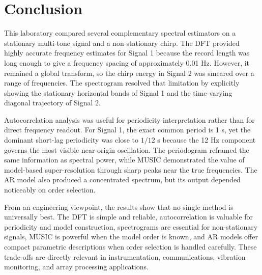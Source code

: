 \documentclass[12pt, a4paper]{article}
\begin{document}
\section{Conclusion}
This laboratory compared several complementary spectral estimators on a stationary multi-tone signal and a non-stationary chirp. The DFT provided highly accurate frequency estimates for Signal 1 because the record length was long enough to give a frequency spacing of approximately 0.01 Hz. However, it remained a global transform, so the chirp energy in Signal 2 was smeared over a range of frequencies. The spectrogram resolved that limitation by explicitly showing the stationary horizontal bands of Signal 1 and the time-varying diagonal trajectory of Signal 2.

Autocorrelation analysis was useful for periodicity interpretation rather than for direct frequency readout. For Signal 1, the exact common period is 1 s, yet the dominant short-lag periodicity was close to $1/12$ s because the 12 Hz component governs the most visible near-origin oscillation. The periodogram reframed the same information as spectral power, while MUSIC demonstrated the value of model-based super-resolution through sharp peaks near the true frequencies. The AR model also produced a concentrated spectrum, but its output depended noticeably on order selection.

From an engineering viewpoint, the results show that no single method is universally best. The DFT is simple and reliable, autocorrelation is valuable for periodicity and model construction, spectrograms are essential for non-stationary signals, MUSIC is powerful when the model order is known, and AR models offer compact parametric descriptions when order selection is handled carefully. These trade-offs are directly relevant in instrumentation, communications, vibration monitoring, and array processing applications.
\end{document}
